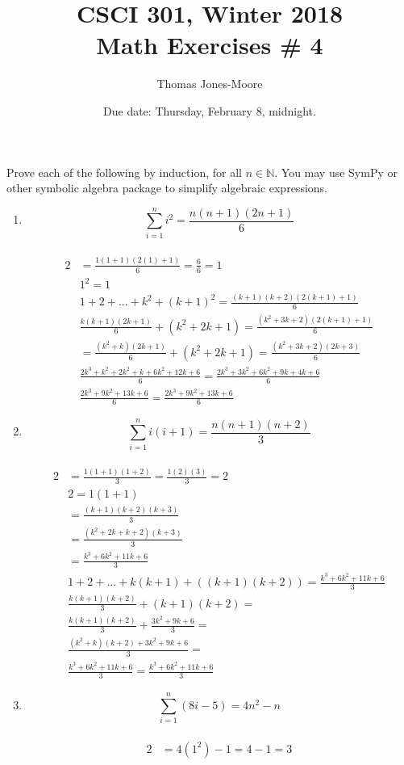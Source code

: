 \documentclass{article}
\title{CSCI 301, Winter 2018\\Math Exercises \# 4}
\author{Thomas Jones-Moore}
\date{Due date:  Thursday, February 8, midnight.}
\newcommand{\nats}{\ensuremath{\mathbb{N}}}
\begin{document}
\maketitle

Prove each of the following by induction, for all $n\in\nats$.
You may use SymPy or other symbolic algebra package to simplify
algebraic expressions.

\begin{enumerate}
\item
  \[
 \sum_{i=1}^n i^2 = \frac{n(n+1)(2n+1)}{6}
  \] \\
  \begin{alignat*}{2}
   &= \frac{1(1+1)(2(1)+1)}{6}=\frac{6}{6}=1 \\
   &1^2=1 \\
   &1+2+...+k^2+(k+1)^2= \frac{(k+1)(k+2)(2(k+1)+1)}{6} \\
   & \frac{k(k+1)(2k+1)}{6}+(k^2+2k+1) =\frac{(k^2+3k+2)(2(k+1)+1)}{6}\\
   &= \frac{(k^2+k)(2k+1)}{6}+(k^2+2k+1) =\frac{(k^2+3k+2)(2k+3)}{6}\\
   & \frac{2k^3+k^2+2k^2+k+6k^2+12k+6}{6}=\frac{2k^3+3k^2+6k^2+9k+4k+6}{6} \\
   &\frac{2k^3+9k^2+13k+6}{6}=\frac{2k^3+9k^2+13k+6}{6}
  \end{alignat*}
\item
  \[
 \sum_{i=1}^n i(i+1) = \frac{n(n+1)(n+2)}{3}
  \] \\
  \begin{alignat*}{2}
  &= \frac{1(1+1)(1+2)}{3}=\frac{1(2)(3)}{3}=2 \\
  &2=1(1+1) \\
  &= \frac{(k+1)(k+2)(k+3)}{3}  \\
  &= \frac{(k^2+2k+k+2)(k+3)}{3} \\
  &= \frac{k^3+6k^2+11k+6}{3} \\
  &1+2+...+k(k+1)+((k+1)(k+2))= \frac{k^3+6k^2+11k+6}{3} \\
  &\frac{k(k+1)(k+2)}{3}+(k+1)(k+2)= \\
  &\frac{k(k+1)(k+2)}{3}+\frac{3k^2+9k+6}{3}= \\
  &\frac{(k^2+k)(k+2)+3k^2+9k+6}{3}= \\
  &\frac{k^3+6k^2+11k+6}{3}=\frac{k^3+6k^2+11k+6}{3}
  \end{alignat*}
\item
  \[
 \sum_{i=1}^n (8i-5) = 4n^2 - n
 \] \\
 \begin{alignat*}{2}
 &= 4(1^2)-1=4-1=3\\

\end{alignat*}
\end{enumerate}
\end{document}
